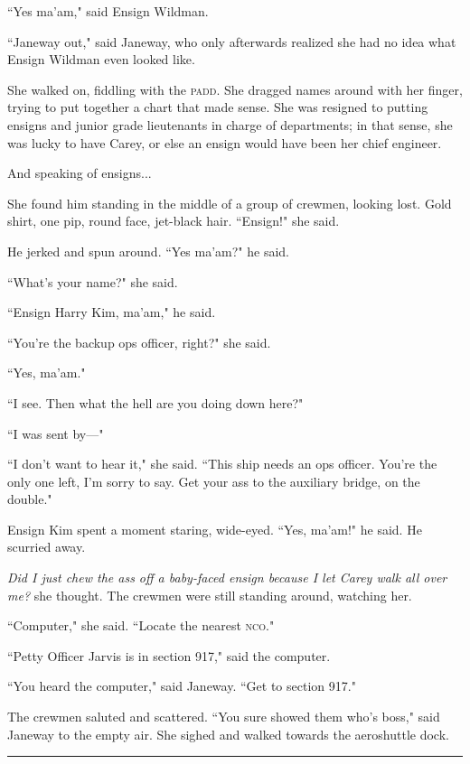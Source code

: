 \documentclass[twoside,letterpaper,12pt]{memoir}
\begin{document}
``Yes ma'am," said Ensign Wildman.

``Janeway out," said Janeway, who only afterwards realized she had no idea what Ensign Wildman even looked like.

She walked on, fiddling with the \textsc{padd}. She dragged names around with her finger, trying to put together a chart that made sense. She was resigned to putting ensigns and junior grade lieutenants in charge of departments; in that sense, she was lucky to have Carey, or else an ensign would have been her chief engineer.

And speaking of ensigns...

She found him standing in the middle of a group of crewmen, looking lost. Gold shirt, one pip, round face, jet-black hair. ``Ensign!" she said.

He jerked and spun around. ``Yes ma'am?" he said.

``What's your name?" she said.

``Ensign Harry Kim, ma'am," he said.

``You're the backup ops officer, right?" she said.

``Yes, ma'am."

``I see. Then what the hell are you doing down here?"

``I was sent by---"

``I don't want to hear it," she said. ``This ship needs an ops officer. You're the only one left, I'm sorry to say. Get your ass to the auxiliary bridge, on the double."

Ensign Kim spent a moment staring, wide-eyed. ``Yes, ma'am!" he said. He scurried away.

\textit{Did I just chew the ass off a baby-faced ensign because I let Carey walk all over me?} she thought. The crewmen were still standing around, watching her.

``Computer," she said. ``Locate the nearest \textsc{nco}."

``Petty Officer Jarvis is in section 917," said the computer.

``You heard the computer," said Janeway. ``Get to section 917."

The crewmen saluted and scattered. ``You sure showed them who's boss," said Janeway to the empty air. She sighed and walked towards the aeroshuttle dock.

\begin{center}\rule{3cm}{0.4 pt}\end{center}
\end{document}

